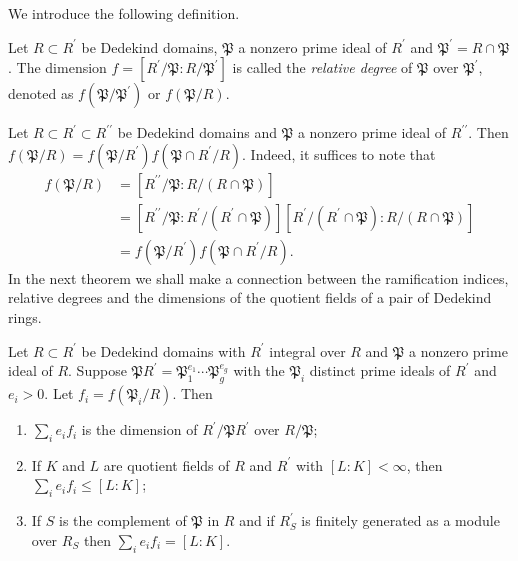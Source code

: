 We introduce the following definition.
\begin{definition}
Let $R\subset R^\prime$ be Dedekind domains, $\mathfrak{P}$ a nonzero prime ideal of $R^\prime$ and $\mathfrak{P}^\prime=R\cap\mathfrak{P}$. The dimension $f=[R^\prime/\mathfrak{P}:R/\mathfrak{P}^\prime]$ is called the \textit{relative degree} of $\mathfrak{P}$ over $\mathfrak{P}^\prime$, denoted as $f(\mathfrak{P}/\mathfrak{P}^\prime)$ or $f(\mathfrak{P}/R)$.
\end{definition}
Let $R\subset R^\prime\subset R^{\prime\prime}$ be Dedekind domains and $\mathfrak{P}$ a nonzero prime ideal of $R^{\prime\prime}$. Then $f\left( \mathfrak{P} /R \right) =f\left( \mathfrak{P} /R^{\prime} \right) f\left( \mathfrak{P} \cap R^{\prime}/R \right) $. Indeed, it suffices to note that 
$$
\begin{aligned}
f\left( \mathfrak{P} /R \right) &=\left[ R^{\prime\prime}/\mathfrak{P} :R/\left( R\cap \mathfrak{P} \right) \right] 
\\
&=\left[ R^{\prime\prime}/\mathfrak{P} :R^{\prime}/\left( R^{\prime}\cap \mathfrak{P} \right) \right] \left[ R^{\prime}/\left( R^{\prime}\cap \mathfrak{P} \right) :R/\left( R\cap \mathfrak{P} \right) \right] 
\\
&=f\left( \mathfrak{P} /R^{\prime} \right) f\left( \mathfrak{P} \cap R^{\prime}/R \right) .
\end{aligned}
$$
In the next theorem we shall make a connection between the ramification indices, relative degrees and the dimensions of the quotient fields of a pair of Dedekind rings.
\begin{theorem}\label{DedeDim}
Let $R\subset R^\prime$ be Dedekind domains with $R^\prime$ integral over $R$ and $\mathfrak{P}$ a nonzero prime ideal of $R$. Suppose $\mathfrak{P} R^{\prime}=\mathfrak{P} _{1}^{e_1}\cdots \mathfrak{P} _{g}^{e_g}$ with the $\mathfrak{P}_i$ distinct prime ideals of $R^\prime$ and $e_i>0$. Let $f_i=f(\mathfrak{P}_i/R)$. Then 
\begin{enumerate}
    \item $\sum_ie_if_i$ is the dimension of $R^\prime/\mathfrak{P}R^\prime$ over $R/\mathfrak{P}$;
    \item If $K$ and $L$ are quotient fields of $R$ and $R^\prime$ with $[L:K]<\infty$, then $\sum_ie_if_i\le [L:K]$;
    \item If $S$ is the complement of $\mathfrak{P}$ in $R$ and if $R_S^\prime$ is finitely generated as a module over $R_S$ then $\sum_ie_if_i=[L:K]$.
\end{enumerate}
\end{theorem}
